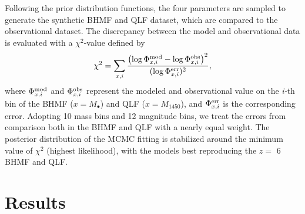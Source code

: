 \documentclass[twocolumn, twocolappendix]{aastex63}
\newcommand{\Mbh}{M_\bullet}
\newcommand{\Muv}{M_{1450}}
\begin{document}
\begin{CJK*}{UTF8}{gbsn}
  

Following the prior distribution functions, the four parameters are sampled to generate the synthetic 
BHMF and QLF dataset, which are compared to the observational dataset. 
The discrepancy between the model and observational data is evaluated with a $\chi^2$-value defined by
%
\begin{align}
  \chi^2 = \sum_{x,i}
  \frac{\left(\log{\Phi^{\rm mod}_{x,i}} - \log{\Phi^{\rm obs}_{x,i}}\right)^2}{(\log{\Phi^{\rm err}_{x,i}})^2},
\end{align}
%
where $\Phi^{\rm mod}_{x,i}$ and $\Phi^{\rm obs}_{x,i}$ represent the modeled and observational value 
on the \textit{i-}th bin of the BHMF ($x=\Mbh$) and QLF ($x=\Muv$), and $\Phi^{\rm err}_{x,i}$ is the corresponding error.
Adopting 10 mass bins and 12 magnitude bins, we treat the errors from comparison both in the BHMF and QLF
with a nearly equal weight.
The posterior distribution of the MCMC fitting is stabilized around the minimum value of $\chi^2$ (highest likelihood), 
with the models best reproducing the $z=$ 6 BHMF and QLF.



\vspace{2mm}
\section{Results}\label{sec:fitting_result}




\end{CJK*}
\end{document}
